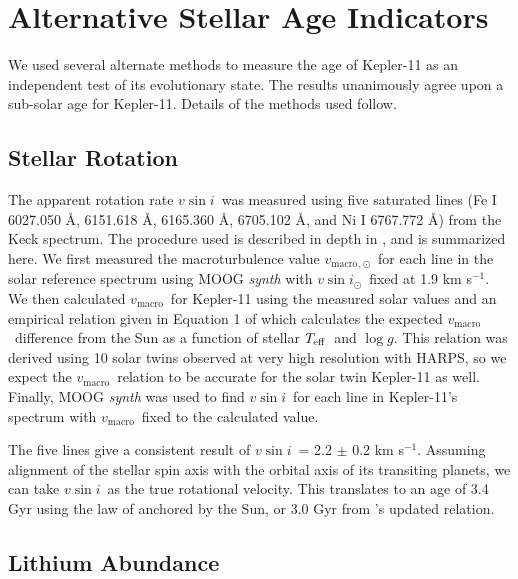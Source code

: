 \documentclass[twocolumn,trackchanges]{aastex61}
\newcommand{\teff}{$T_{\rm eff}$}
\newcommand{\logg}{$\log g$}
\newcommand{\vsini}{$v \sin{i}$}
\newcommand{\vmacro}{$v_{\mathrm{macro}}$}
\newcommand{\kms}{km s$^{-1}$}
\begin{document}
\section{Alternative Stellar Age Indicators}
\label{s:ages}

 We used several alternate methods to measure the age of Kepler-11 as an independent test of its evolutionary state. The results unanimously agree upon a sub-solar age for Kepler-11. Details of the methods used follow.

\subsection{Stellar Rotation}

The apparent rotation rate \vsini\ was measured using five saturated lines (Fe I 6027.050 \r{A}, 6151.618 \r{A}, 6165.360 \r{A}, 6705.102 \r{A}, and Ni I 6767.772 \r{A}) from the Keck spectrum. The procedure used is described in depth in \citet{dosSantos2016}, and is summarized here. We first measured the macroturbulence value \vmacro$_{,\odot}$\ for each line in the solar reference spectrum using MOOG \textit{synth} with \vsini$_{\odot}$\ fixed at 1.9 \kms. We then calculated \vmacro\ for Kepler-11 using the measured solar values and an empirical relation given in Equation 1 of \citet{dosSantos2016} which calculates the expected \vmacro\ difference from the Sun as a function of stellar \teff\ and \logg. This relation was derived using 10 solar twins observed at very high resolution with HARPS, so we expect the \vmacro\ relation to be accurate for the solar twin Kepler-11 as well. Finally, MOOG \textit{synth} was used to find \vsini\ for each line in Kepler-11's spectrum with \vmacro\ fixed to the calculated value.

The five lines give a consistent result of \vsini\ = 2.2 $\pm$ 0.2 \kms. Assuming alignment of the stellar spin axis with the orbital axis of its transiting planets, we can take \vsini\ as the true rotational velocity. This translates to an age of 3.4 Gyr using the law of \citet{Skumanich1972} anchored by the Sun, or 3.0 Gyr from \citet{dosSantos2016}'s updated relation.

\subsection{Lithium Abundance}
\label{s:lithium}
\end{document}
